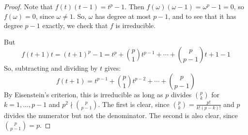 \begin{proof}
    Note that $f(t)(t-1) = t^p-1$. Then $f(\omega)(\omega-1) = \omega^p-1 = 0$, so $f(\omega) = 0$, since $\omega \neq 1$. So, $\omega$ has degree at most $p-1$, and to see that it has degree $p-1$ exactly, we check that $f$ is irreducible.

    But
    \[ f(t+1)t = (t+1)^p-1 = t^p + {p \choose 1}t^{p-1} + \cdots + {p \choose p-1}t + 1 - 1 \]
    So, subtracting and dividing by $t$ gives:
    \[ f(t+1) = t^{p-1} + {p \choose 1}t^{p-2} + \cdots + {p \choose p-1} \]
    By Eisenstein's criterion, this is irreducible as long as $p$ divides ${p \choose k}$ for $k=1,\ldots,p-1$ and $p^2 \nmid {p \choose p-1}$. The first is clear, since ${p \choose k} = \frac{p!}{k!(p-k)!}$ and $p$ divides the numerator but not the denominator. The second is also clear, since ${p \choose p-1} = p$.
\end{proof}